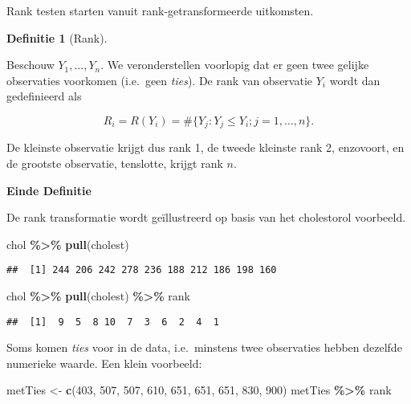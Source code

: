 \documentclass[
  12pt,dutch,coursenotes]{book}
\newenvironment{Shaded}{\begin{snugshade}}{\end{snugshade}}
\newcommand{\DecValTok}[1]{\textcolor[rgb]{0.00,0.00,0.81}{#1}}
\newcommand{\KeywordTok}[1]{\textcolor[rgb]{0.13,0.29,0.53}{\textbf{#1}}}
\newcommand{\NormalTok}[1]{#1}
\newcommand{\OperatorTok}[1]{\textcolor[rgb]{0.81,0.36,0.00}{\textbf{#1}}}
\newcommand{\StringTok}[1]{\textcolor[rgb]{0.31,0.60,0.02}{#1}}
\theoremstyle{definition}
\newtheorem{definition}{Definitie}[chapter]
\theoremstyle{definition}
\theoremstyle{definition}
\theoremstyle{remark}
\begin{document}
Rank testen starten vanuit rank-getransformeerde uitkomsten.

\begin{definition}[Rank]
\protect\hypertarget{def:unnamed-chunk-207}{}{\label{def:unnamed-chunk-207} \iffalse (Rank) \fi{} }
\end{definition}
Beschouw \(Y_1, \ldots, Y_n\). We veronderstellen voorlopig dat
er geen twee gelijke observaties voorkomen (i.e.~geen \emph{ties}).
De rank van observatie \(Y_i\) wordt dan
gedefinieerd als

\begin{equation*}
   R_i=R(Y_i) = \#\{Y_j: Y_j\leq Y_i; j=1,\ldots, n\}.
  \end{equation*}

De kleinste observatie krijgt dus rank 1, de tweede kleinste rank 2, enzovoort, en de grootste observatie,
tenslotte, krijgt rank \(n\).

\textbf{Einde Definitie}

De rank transformatie wordt geïllustreerd op basis van het cholestorol voorbeeld.

\begin{Shaded}
\begin{Highlighting}[]
\NormalTok{chol }\OperatorTok{\%\textgreater{}\%}\StringTok{ }\KeywordTok{pull}\NormalTok{(cholest)}
\end{Highlighting}
\end{Shaded}

\begin{verbatim}
##  [1] 244 206 242 278 236 188 212 186 198 160
\end{verbatim}

\begin{Shaded}
\begin{Highlighting}[]
\NormalTok{chol }\OperatorTok{\%\textgreater{}\%}\StringTok{ }\KeywordTok{pull}\NormalTok{(cholest) }\OperatorTok{\%\textgreater{}\%}\StringTok{ }\NormalTok{rank}
\end{Highlighting}
\end{Shaded}

\begin{verbatim}
##  [1]  9  5  8 10  7  3  6  2  4  1
\end{verbatim}

Soms komen \emph{ties} voor in de data, i.e.~minstens twee observaties hebben dezelfde numerieke waarde. Een klein voorbeeld:

\begin{Shaded}
\begin{Highlighting}[]
\NormalTok{metTies \textless{}{-}}\StringTok{ }\KeywordTok{c}\NormalTok{(}\DecValTok{403}\NormalTok{, }\DecValTok{507}\NormalTok{, }\DecValTok{507}\NormalTok{, }\DecValTok{610}\NormalTok{, }\DecValTok{651}\NormalTok{, }\DecValTok{651}\NormalTok{, }\DecValTok{651}\NormalTok{, }\DecValTok{830}\NormalTok{, }
    \DecValTok{900}\NormalTok{)}
\NormalTok{metTies }\OperatorTok{\%\textgreater{}\%}\StringTok{ }\NormalTok{rank}
\end{Highlighting}
\end{Shaded}
\end{document}
